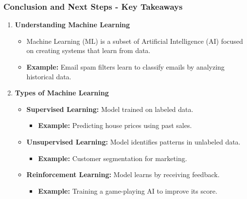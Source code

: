 \documentclass[aspectratio=169]{beamer}
\begin{document}
\begin{frame}[fragile]
    \frametitle{Conclusion and Next Steps - Key Takeaways}
    \begin{enumerate}
        \item \textbf{Understanding Machine Learning}
        \begin{itemize}
            \item Machine Learning (ML) is a subset of Artificial Intelligence (AI) focused on creating systems that learn from data.
            \item \textbf{Example:} Email spam filters learn to classify emails by analyzing historical data.
        \end{itemize}

        \item \textbf{Types of Machine Learning}
        \begin{itemize}
            \item \textbf{Supervised Learning:} Model trained on labeled data.
                \begin{itemize}
                    \item \textbf{Example:} Predicting house prices using past sales.
                \end{itemize}
            \item \textbf{Unsupervised Learning:} Model identifies patterns in unlabeled data.
                \begin{itemize}
                    \item \textbf{Example:} Customer segmentation for marketing.
                \end{itemize}
            \item \textbf{Reinforcement Learning:} Model learns by receiving feedback.
                \begin{itemize}
                    \item \textbf{Example:} Training a game-playing AI to improve its score.
                \end{itemize}
        \end{itemize}
    \end{enumerate}
\end{frame}
\end{document}
